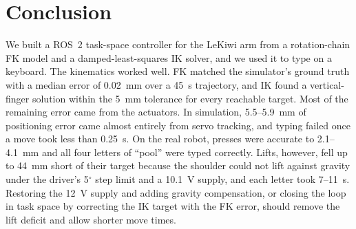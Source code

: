 \documentclass[conference]{IEEEtran}
\begin{document}
\section{Conclusion}
\label{sec:conclusion}
We built a ROS~2 task-space controller for the LeKiwi arm from a rotation-chain FK model and a damped-least-squares IK solver, and we used it to type on a keyboard. The kinematics worked well. FK matched the simulator's ground truth with a median error of 0.02~mm over a 45~s trajectory, and IK found a vertical-finger solution within the 5~mm tolerance for every reachable target. Most of the remaining error came from the actuators. In simulation, 5.5--5.9~mm of positioning error came almost entirely from servo tracking, and typing failed once a move took less than 0.25~s. On the real robot, presses were accurate to 2.1--4.1~mm and all four letters of ``pool'' were typed correctly. Lifts, however, fell up to 44~mm short of their target because the shoulder could not lift against gravity under the driver's 5$^\circ$ step limit and a 10.1~V supply, and each letter took 7--11~s. Restoring the 12~V supply and adding gravity compensation, or closing the loop in task space by correcting the IK target with the FK error, should remove the lift deficit and allow shorter move times.



\end{document}
